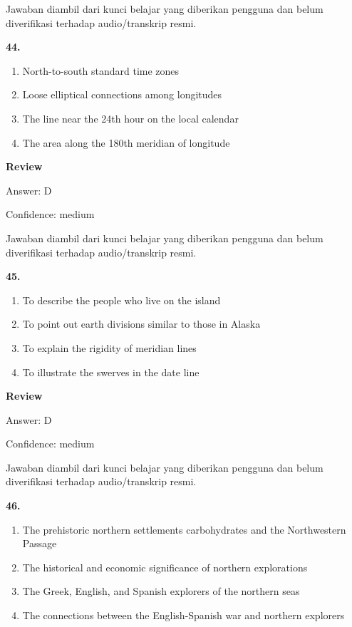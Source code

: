 \documentclass[12pt]{article}
\begin{document}
Jawaban diambil dari kunci belajar yang diberikan pengguna dan belum diverifikasi terhadap audio/transkrip resmi.\par
\endgroup
\par
\vspace{0.25\baselineskip}
\noindent\textbf{44.}
\begin{enumerate}[label=(\Alph*),leftmargin=*,itemsep=0.2em]
\item North-to-south standard time zones
\item Loose elliptical connections among longitudes
\item The line near the 24th hour on the local calendar
\item The area along the 180th meridian of longitude
\end{enumerate}
\par
\begingroup
\setlength{\parskip}{0pt}
\setlength{\parindent}{0pt}
\textbf{Review}\par
Answer: D\par
Confidence: medium\par
Jawaban diambil dari kunci belajar yang diberikan pengguna dan belum diverifikasi terhadap audio/transkrip resmi.\par
\endgroup
\par
\vspace{0.25\baselineskip}
\noindent\textbf{45.}
\begin{enumerate}[label=(\Alph*),leftmargin=*,itemsep=0.2em]
\item To describe the people who live on the island
\item To point out earth divisions similar to those in Alaska
\item To explain the rigidity of meridian lines
\item To illustrate the swerves in the date line
\end{enumerate}
\par
\begingroup
\setlength{\parskip}{0pt}
\setlength{\parindent}{0pt}
\textbf{Review}\par
Answer: D\par
Confidence: medium\par
Jawaban diambil dari kunci belajar yang diberikan pengguna dan belum diverifikasi terhadap audio/transkrip resmi.\par
\endgroup
\par
\vspace{0.25\baselineskip}
\noindent\textbf{46.}
\begin{enumerate}[label=(\Alph*),leftmargin=*,itemsep=0.2em]
\item The prehistoric northern settlements carbohydrates and the Northwestern Passage
\item The historical and economic significance of northern explorations
\item The Greek, English, and Spanish explorers of the northern seas
\item The connections between the English-Spanish war and northern explorers
\end{enumerate}
\end{document}
